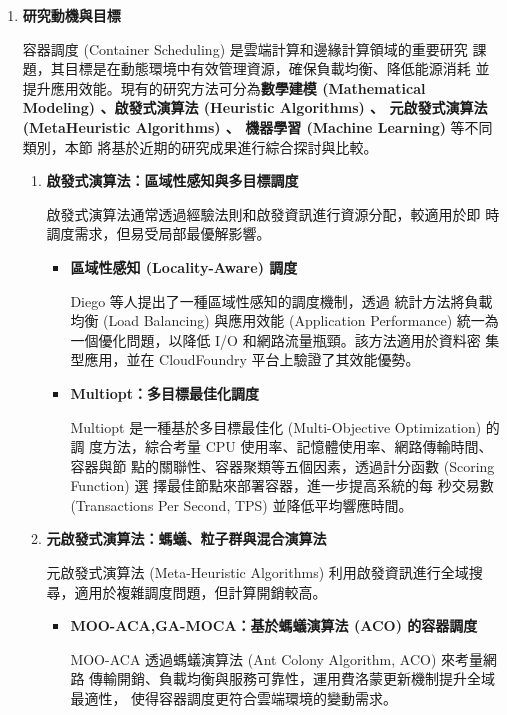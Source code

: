 \documentclass[12pt,a4paper]{article}
\begin{document}
\begin{enumerate}[label={(\zhdig*)}, leftmargin=2\parindent, listparindent=\parindent]
\begin{enumerate}[label={(\arabic*)}, leftmargin=\parindent, listparindent=\parindent]
\begin{itemize}[leftmargin=\parindent, listparindent=\parindent]
    \end{itemize}
    \item \textbf{研究動機與目標}

容器調度 (Container Scheduling) 是雲端計算和邊緣計算領域的重要研究
課題，其目標是在動態環境中有效管理資源，確保負載均衡、降低能源消耗
並提升應用效能。現有的研究方法\cite{11}可分為\textbf{數學建模 (Mathematical
Modeling) 、啟發式演算法 (Heuristic Algorithms) 、
元啟發式演算法 (MetaHeuristic Algorithms) 、
機器學習 (Machine Learning) }等不同類別，本節
將基於近期的研究成果進行綜合探討與比較。

\begin{enumerate}[label={(\zhdig*)}, leftmargin=\parindent, listparindent=\parindent]

\item \textbf{啟發式演算法：區域性感知與多目標調度}

啟發式演算法通常透過經驗法則和啟發資訊進行資源分配，較適用於即
時調度需求，但易受局部最優解影響。
\begin{itemize}[leftmargin=\parindent, listparindent=\parindent]
    \item \textbf{
        \cite{12} 區域性感知 (Locality-Aware) 調度}

    Diego 等人提出了一種區域性感知的調度機制，透過
    統計方法將負載均衡 (Load Balancing) 與應用效能 (Application Performance)
    統一為一個優化問題，以降低 I/O 和網路流量瓶頸。該方法適用於資料密
    集型應用，並在 CloudFoundry 平台上驗證了其效能優勢。
    \item \textbf{\cite{13} Multiopt：多目標最佳化調度}

    Multiopt 是一種基於多目標最佳化 (Multi-Objective Optimization) 的調
    度方法，綜合考量 CPU 使用率、記憶體使用率、網路傳輸時間、容器與節
    點的關聯性、容器聚類等五個因素，透過計分函數 (Scoring Function) 選
    擇最佳節點來部署容器，進一步提高系統的每
    秒交易數 (Transactions Per Second, TPS) 並降低平均響應時間。

\end{itemize}
\item \textbf{
    元啟發式演算法：螞蟻、粒子群與混合演算法
}

元啟發式演算法 (Meta-Heuristic Algorithms) 利用啟發資訊進行全域搜
尋，適用於複雜調度問題，但計算開銷較高。
\begin{itemize}[leftmargin=\parindent, listparindent=\parindent]
    \item \textbf{\cite{14} MOO-ACA,GA-MOCA：基於螞蟻演算法 (ACO) 的容器調度}

    MOO-ACA 透過螞蟻演算法 (Ant Colony Algorithm, ACO) 來考量網路
    傳輸開銷、負載均衡與服務可靠性，運用費洛蒙更新機制提升全域最適性，
    使得容器調度更符合雲端環境的變動需求。


\end{itemize}
\end{enumerate}
\end{enumerate}
\end{enumerate}
\end{document}
